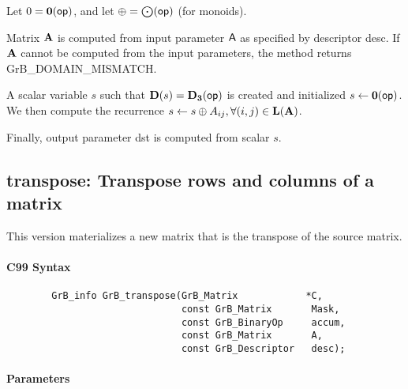 
Let $0 = \bold{0}({\sf op})$, and let $\oplus = \bigodot({\sf op})$ (for monoids).

Matrix ${\bf A}$ is computed from input parameter ${\sf A}$ as
specified by descriptor {\sf desc}. If ${\bf A}$ cannot be computed
from the input parameters, the method returns {\sf GrB\_DOMAIN\_MISMATCH}.

A scalar variable $s$ such that $\bold{D}(s) = \bold{D_3}({\sf op})$ is
created and initialized $s \leftarrow \bold{0}({\sf op})$. 
We then compute the recurrence $s \leftarrow s \oplus A_{ij}, \forall (i, j) \in \bold{L}({\bf A})$.

Finally, output parameter {\sf dst} is computed from scalar $s$.


\subsection{{\sf transpose}: Transpose rows and columns of a matrix}

This version materializes a new matrix that is the transpose of the source matrix.


\paragraph{C99 Syntax}

\begin{verbatim}
        GrB_info GrB_transpose(GrB_Matrix            *C,
                               const GrB_Matrix       Mask,
                               const GrB_BinaryOp     accum,
                               const GrB_Matrix       A,
                               const GrB_Descriptor   desc);
\end{verbatim}

\paragraph{Parameters}

